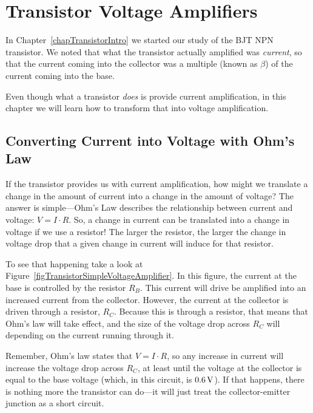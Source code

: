 \chapter{Transistor Voltage Amplifiers}


In Chapter~\ref{chapTransistorIntro} we started our study of the BJT NPN transistor.
We noted that what the transistor actually amplified was \emph{current}, so that the current coming into the collector was a multiple (known as $\beta$) of the current coming into the base.

Even though what a transistor \emph{does} is provide current amplification, in this chapter we will learn how to transform that into voltage amplification.

\section{Converting Current into Voltage with Ohm's Law}

If the transistor provides us with current amplification, how might we translate a change in the amount of current into a change in the amount of voltage?
The answer is simple---Ohm's Law describes the relationship between current and voltage: $V = I\cdot R$.
So, a change in current can be translated into a change in voltage if we use a resistor!
The larger the resistor, the larger the change in voltage drop that a given change in current will induce for that resistor.


To see that happening take a look at Figure~\ref{figTransistorSimpleVoltageAmplifier}.
In this figure, the current at the base is controlled by the resistor $R_B$.
This current will drive be amplified into an increased current from the collector.
However, the current at the collector is driven through a resistor, $R_C$.
Because this is through a resistor, that means that Ohm's law will take effect, and the size of the voltage drop across $R_C$ will depending on the current running through it.

Remember, Ohm's law states that $V = I\cdot R$, so any increase in current will increase the voltage drop across $R_C$, at least until the voltage at the collector is equal to the base voltage (which, in this circuit, is $0.6\,\si{\volt}$).
If that happens, there is nothing more the transistor can do---it will just treat the collector-emitter junction as a short circuit.

